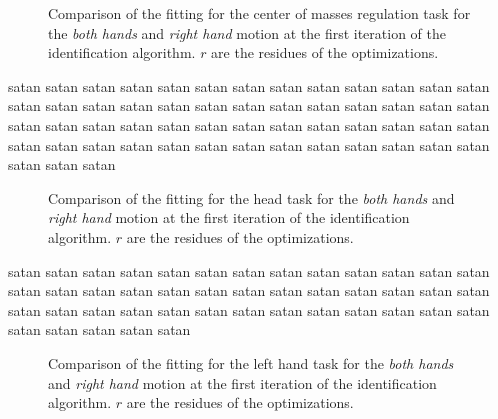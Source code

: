 \documentclass[letterpaper, 10pt, conference]{ieeeconf}      %
\begin{document}

\begin{figure}[t]
  \centering
  \caption{Comparison of the fitting for the center of masses regulation task for the \emph{both hands} and \emph{right hand} motion at the first iteration of the identification algorithm.
  $r$ are the residues of the optimizations.}
  \label{fig:exp1:taskCom0}
\end{figure}

satan satan satan satan satan satan satan satan satan satan satan
satan satan satan satan satan satan satan satan satan satan satan
satan satan satan satan satan satan satan satan satan satan satan
satan satan satan satan satan satan satan satan satan satan satan
satan satan satan satan satan satan satan satan satan satan satan

\begin{figure}[t]
  \centering
  \caption{Comparison of the fitting for the head task for the
  \emph{both hands} and \emph{right hand} motion at the first
  iteration of the identification algorithm.  $r$ are
  the residues of the optimizations.}
  \label{fig:exp1:taskHead0}
\end{figure}

satan satan satan satan satan satan satan satan satan satan satan
satan satan satan satan satan satan satan satan satan satan satan
satan satan satan satan satan satan satan satan satan satan satan
satan satan satan satan satan satan satan satan satan satan satan

\begin{figure}[t]
  \centering
  \caption{Comparison of the fitting for the left hand task for the
  \emph{both hands} and \emph{right hand} motion at the first
  iteration of the identification algorithm.  $r$ are
  the residues of the optimizations.}
  \label{fig:exp1:taskLhand0}
\end{figure}
\end{document}
